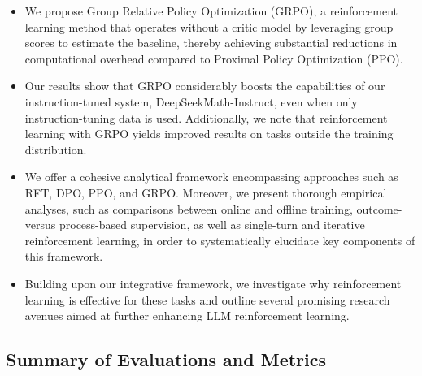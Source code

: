 \begin{itemize}[topsep=0pt]
    \item We propose Group Relative Policy Optimization (GRPO), a reinforcement learning method that operates without a critic model by leveraging group scores to estimate the baseline, thereby achieving substantial reductions in computational overhead compared to Proximal Policy Optimization (PPO).
    \item Our results show that GRPO considerably boosts the capabilities of our instruction-tuned system, DeepSeekMath-Instruct, even when only instruction-tuning data is used. Additionally, we note that reinforcement learning with GRPO yields improved results on tasks outside the training distribution.
    \item We offer a cohesive analytical framework encompassing approaches such as RFT, DPO, PPO, and GRPO. Moreover, we present thorough empirical analyses, such as comparisons between online and offline training, outcome- versus process-based supervision, as well as single-turn and iterative reinforcement learning, in order to systematically elucidate key components of this framework.
    \item Building upon our integrative framework, we investigate why reinforcement learning is effective for these tasks and outline several promising research avenues aimed at further enhancing LLM reinforcement learning.
\end{itemize}

\subsection{Summary of Evaluations and Metrics}

